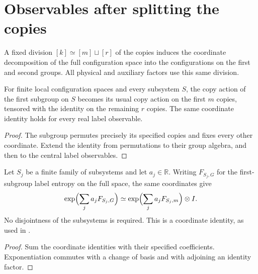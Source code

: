 \section{Observables after splitting the copies}
\label{sec:grouped_configuration_transport}

\begin{definition}
\label{def:grouped_configuration_equiv}
\leanok
A fixed division $[k]\simeq[m]\sqcup[r]$ of the copies induces
the coordinate decomposition of the full configuration space into
the configurations on the first and second groups. All physical
and auxiliary factors use this same division.
\end{definition}

\begin{theorem}
\label{thm:grouped_configuration_label_observable}
\leanok
For finite local configuration spaces and every subsystem $S$, the copy action of the first subgroup on $S$
becomes its usual copy action on the first $m$ copies, tensored with
the identity on the remaining $r$ copies. The same coordinate identity
holds for every real label observable.
\end{theorem}
\begin{proof}
\leanok
{}
The subgroup permutes precisely its specified copies and fixes every
other coordinate. Extend the identity from permutations to their
group algebra, and then to the central label observables.
\end{proof}

\begin{theorem}
\label{thm:grouped_configuration_exponential}
\leanok
Let $S_j$ be a finite family of subsystems and let $a_j\in\mathbb R$.
Writing $F_{S_j,G}$ for the first-subgroup label entropy on the full
space, the same coordinates give
\begin{align*}
 \exp\Bigl(\sum_j a_jF_{S_j,G}\Bigr)
 \simeq \exp\Bigl(\sum_j a_jF_{S_j,m}\Bigr)\otimes I.
\end{align*}
No disjointness of the subsystems is required. This is a coordinate
identity, as used in
\cite[Section~8, lines~454--560]{OpenAI2026AreaLaw}.
\end{theorem}
\begin{proof}
\leanok
{}
Sum the coordinate identities with their specified coefficients.
Exponentiation commutes with a change of basis and with adjoining
an identity factor.
\end{proof}
